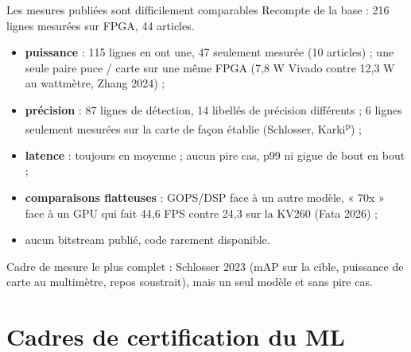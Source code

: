\documentclass[aspectratio=169,11pt]{beamer}
\newcommand{\pre}{\textsuperscript{\color{acc}p}}
\begin{document}
\begin{frame}{Les mesures publiées sont difficilement comparables}
  \small
  Recompte de la base : 216 lignes mesurées sur FPGA, 44 articles.
  \begin{itemize}
    \item \textbf{puissance} : 115 lignes en ont une, 47 seulement mesurée (10 articles) ;
          une seule paire puce / carte sur une même FPGA (7,8 W Vivado contre 12,3 W au
          wattmètre, Zhang 2024) ;
    \item \textbf{précision} : 87 lignes de détection, 14 libellés de précision différents ;
          6 lignes seulement mesurées sur la carte de façon établie (Schlosser, Karki\pre) ;
    \item \textbf{latence} : toujours en moyenne ; aucun pire cas, p99 ni gigue de bout en bout ;
    \item \textbf{comparaisons flatteuses} : GOPS/DSP face à un autre modèle, « 70x » face
          à un GPU qui fait 44,6 FPS contre 24,3 sur la KV260 (Fata 2026) ;
    \item aucun bitstream publié, code rarement disponible.
  \end{itemize}

  \vspace{0.3em}
  Cadre de mesure le plus complet : Schlosser 2023 (mAP sur la cible, puissance de carte au
  multimètre, repos soustrait), mais un seul modèle et sans pire cas.
\end{frame}

\section{Cadres de certification du ML}
\end{document}
